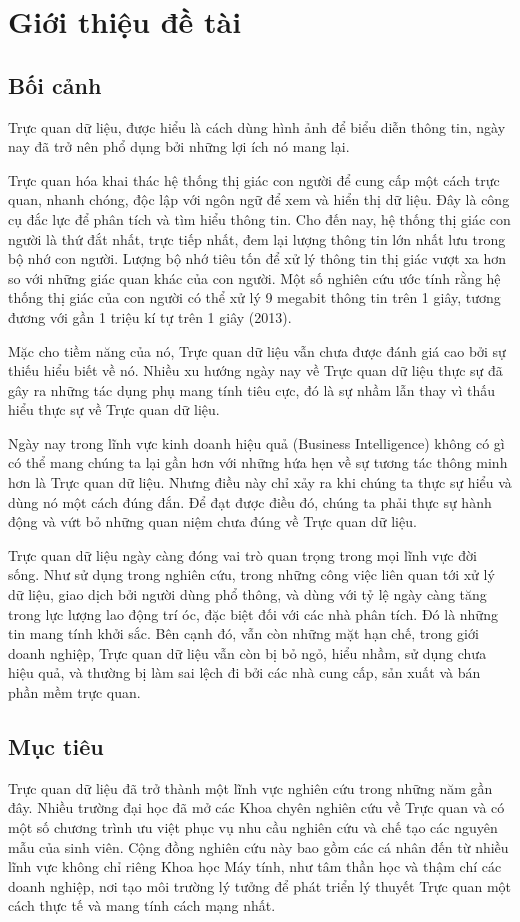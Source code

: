\documentclass[12pt,a4paper,oneside]{article}
\begin{document}
\tableofcontents
\thispagestyle{empty}
\newpage
\section{Giới thiệu đề tài}
\subsection{Bối cảnh}
Trực quan dữ liệu, được hiểu là cách dùng hình ảnh để biểu diễn thông tin, ngày nay đã trở nên phổ dụng bởi những lợi ích nó mang lại.

Trực quan hóa khai thác hệ thống thị giác con người để cung cấp một cách trực quan, nhanh chóng, độc lập với ngôn ngữ để xem và hiển thị dữ liệu. Đây là công cụ đắc lực để phân tích và tìm hiểu thông tin. Cho đến nay, hệ thống thị giác con người là thứ đắt nhất, trực tiếp nhất, đem lại lượng thông tin lớn nhất lưu trong bộ nhớ con người. Lượng bộ nhớ tiêu tốn để xử lý thông tin thị giác vượt xa hơn so với những giác quan khác của con người. Một số nghiên cứu ước tính rằng hệ thống thị giác của con người có thể xử lý 9 megabit thông tin trên 1 giây, tương đương với gần 1 triệu kí tự trên 1 giây (2013)\cite{bigdata}.

Mặc cho tiềm năng của nó, Trực quan dữ liệu vẫn chưa được đánh giá cao bởi sự thiếu hiểu biết về nó. Nhiều xu hướng ngày nay về Trực quan dữ liệu thực sự đã gây ra những tác dụng phụ mang tính tiêu cực, đó là sự nhầm lẫn thay vì thấu hiểu thực sự về Trực quan dữ liệu. 

Ngày nay trong lĩnh vực kinh doanh hiệu quả (Business Intelligence) không có gì có thể mang chúng ta lại gần hơn với những hứa hẹn về sự tương tác thông minh hơn là Trực quan dữ liệu. Nhưng điều này chỉ xảy ra khi chúng ta thực sự hiểu và dùng nó một cách đúng đắn. Để đạt được điều đó, chúng ta phải thực sự hành động và vứt bỏ những quan niệm chưa đúng về Trực quan dữ liệu.

Trực quan dữ liệu ngày càng đóng vai trò quan trọng trong mọi lĩnh vực đời sống. Như sử dụng trong nghiên cứu, trong những công việc liên quan tới xử lý dữ liệu, giao dịch bởi người dùng phổ thông, và dùng với tỷ lệ ngày càng tăng trong lực lượng lao động trí óc, đặc biệt đối với các nhà phân tích. Đó là những tin mang tính khởi sắc. Bên cạnh đó, vẫn còn những mặt hạn chế, trong giới doanh nghiệp, Trực quan dữ liệu vẫn còn bị bỏ ngỏ, hiểu nhầm, sử dụng chưa hiệu quả, và thường bị làm sai lệch đi bởi các nhà cung cấp, sản xuất và bán phần mềm trực quan. 

\subsection{Mục tiêu}
Trực quan dữ liệu đã trở thành một lĩnh vực nghiên cứu trong những năm gần đây. Nhiều trường đại học đã mở các Khoa chyên nghiên cứu về Trực quan và có một số chương trình ưu việt phục vụ nhu cầu nghiên cứu và chế tạo các nguyên mẫu của sinh viên. Cộng đồng nghiên cứu này bao gồm các cá nhân đến từ nhiều lĩnh vực không chỉ riêng Khoa học Máy tính, như tâm thần học và thậm chí các doanh nghiệp, nơi tạo môi trường lý tưởng để phát triển lý thuyết Trực quan một cách thực tế và mang tính cách mạng nhất.
\end{document}
